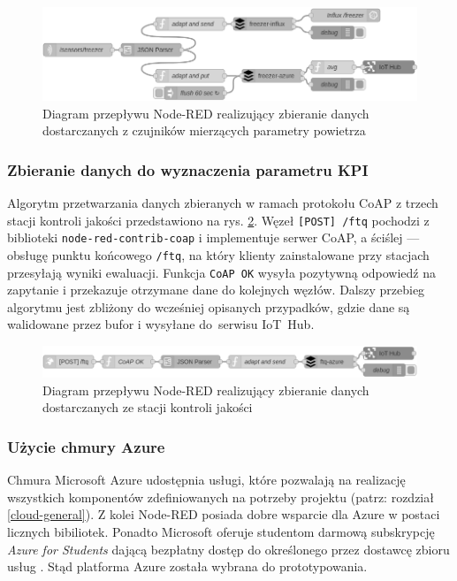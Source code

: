 \documentclass[a4paper, 12pt, twoside]{article}
\begin{document}
\begin{figure}[h]
      \centering
      \includegraphics[width=\textwidth]{flow1.png}
      \caption{Diagram przepływu Node-RED realizujący zbieranie danych dostarczanych z czujników mierzących parametry powietrza}
      \label{fig:flow1}
\end{figure}

\subsubsection{Zbieranie danych do wyznaczenia parametru KPI }

Algorytm przetwarzania danych zbieranych w ramach protokołu CoAP z trzech stacji
kontroli jakości przedstawiono na rys. \ref{fig:flow2}. Węzeł \texttt{[POST] /ftq}
pochodzi z biblioteki \texttt{node-red-contrib-coap} i implementuje serwer CoAP,
a ściślej --- obsługę punktu końcowego \texttt{/ftq}, na który klienty zainstalowane
przy stacjach przesyłają wyniki ewaluacji. Funkcja \texttt{CoAP OK}
wysyła pozytywną odpowiedź na zapytanie i przekazuje otrzymane dane do kolejnych węzłów.
Dalszy przebieg algorytmu jest zbliżony do wcześniej opisanych przypadków,
gdzie dane są walidowane przez bufor i wysyłane do~serwisu IoT~Hub.

\begin{figure}[h]
      \centering
      \includegraphics[width=\textwidth]{flow2.png}
      \caption{Diagram przepływu Node-RED realizujący zbieranie danych dostarczanych ze stacji kontroli jakości}
      \label{fig:flow2}
\end{figure}


\subsubsection{Użycie chmury Azure}

Chmura Microsoft Azure udostępnia usługi, które pozwalają na realizację wszystkich komponentów zdefiniowanych
na potrzeby projektu (patrz: rozdział \ref{cloud-general}).
Z kolei Node-RED posiada dobre wsparcie dla Azure w postaci licznych bibiliotek.
Ponadto Microsoft oferuje studentom darmową subskrypcję \emph{Azure for Students}
dającą bezpłatny dostęp do określonego przez dostawcę zbioru usług \cite{azure-students}. 
Stąd platforma Azure została wybrana do prototypowania.
\end{document}
